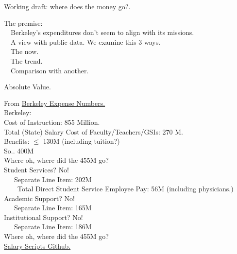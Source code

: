 \documentclass[hyperref={colorlinks}]{beamer}
\newcommand{\skippause}{\vskip5pt
\pause}
\begin{document}
\small

\begin{frame}{Working draft: where does the money go?.}

The premise: \\
~~Berkeley's expenditures don't seem to align with its missions.\\
~~A view with public data. 
\skippause
We examine this 3 ways. \\
\skippause
~~The now. \\
~~The trend. \\
~~Comparison with another. \\


\end{frame}

\begin{frame}{Absolute Value.}

From \href{http://reportingtransparency.universityofcalifornia.edu/}{Berkeley Expense Numbers.} \\

Berkeley: \\

Cost of Instruction: {\color{red} 855 Million.} \\
\skippause
Total (State) Salary Cost of Faculty/Teachers/GSIs: {\color{blue} 270 M.} \\
Benefits: {\color{blue} $\leq$ 130M (including tuition?)} \\
So..{\color{blue} 400M} \\ 
\skippause
Where oh, where did the {\color{red} 455M} go? \\
\skippause
Student Services? No! \\
~~~Separate Line Item: {\color{green} 202M}\\
~~~~Total Direct Student Service Employee Pay: {\color{blue} 56M} (including physicians.)\\
\skippause
Academic Support? No! \\ 
~~~Separate Line Item: {\color{green} 165M} \\
\skippause
Institutional Support? No! \\
~~~Separate Line Item: {\color{green} 186M}  \\
\skippause
Where oh, where did the {\color{red} 455M} go? \\
{\tiny \href{https://github.com/satish0rao/uc-berkeley-finance-analysis}{Salary Scripts Github.}}
\end{frame}
\end{document}
